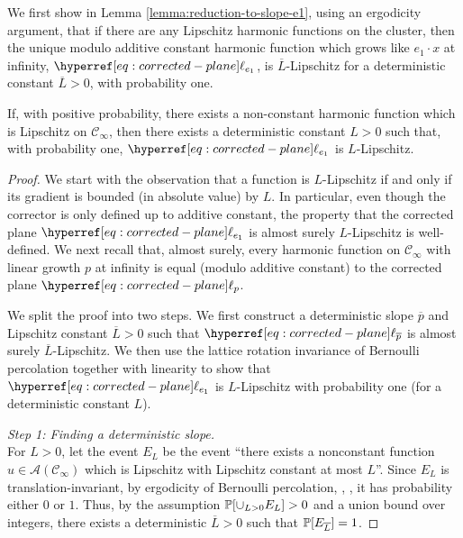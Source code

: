 \documentclass[12pt]{amsart}
\numberwithin{equation}{section}
\begin{document}
	We first show in Lemma \ref{lemma:reduction-to-slope-e1}, using an ergodicity argument, that if there are any Lipschitz harmonic functions on the cluster, then the unique modulo additive constant harmonic function which grows like $e_1 \cdot x$ at infinity, $\ellp{e_1}$, is $\overline{L}$-Lipschitz for a deterministic constant $\overline{L} > 0$,
	with probability one. 
	\begin{lemma} \label{lemma:reduction-to-slope-e1}
		If, with positive probability, there exists a non-constant harmonic function which is Lipschitz on $\mathscr{C}_{\infty}$, then 
		there exists a deterministic constant $L > 0$ such that, with probability one, 
		$\ellp{e_1}$ is $L$-Lipschitz.
	\end{lemma}
	\begin{proof}
		We start with the observation that a function is $L$-Lipschitz if and only if its gradient is bounded (in absolute value) by $L$. In particular, even though the corrector is only defined up to additive constant, the property that the corrected plane $\ellp{e_1}$ is almost surely $L$-Lipschitz is well-defined.
		We next recall that, almost surely, every harmonic function on $\mathscr{C}_{\infty}$ with linear growth $p$ at infinity is equal (modulo additive constant) to the corrected plane $\ellp{p}$. 
		
		
		We split the proof into two steps. We first construct a deterministic slope $\overline{p}$
		and Lipschitz constant $\overline{L} > 0$ such that $\ellp{\overline{p}}$ is almost surely $\overline{L}$-Lipschitz. We then use the lattice rotation invariance 
		of Bernoulli percolation together with linearity to show that $\ellp{e_1}$ is $L$-Lipschitz with probability one (for a deterministic constant $L$).
		
		
		{\it Step 1: Finding a deterministic slope.} \\ 
		For $L > 0$, let the event $E_L$ be the event ``there exists a nonconstant function $u \in \mathcal{A}(\mathscr{C}_\infty)$ which is Lipschitz with Lipschitz constant at most $L$''. Since $E_L$ is translation-invariant, by ergodicity of Bernoulli percolation, \eg, \cite[Proposition 7.3]{lyons-peres-book}, it has probability either $0$ or $1$. Thus, by the assumption $\P[\cup_{L > 0} E_L] > 0$ and a union bound over integers, 
		there exists a deterministic $\overline{L} > 0$ such that $\P[E_{\overline{L}}] = 1$. 
		

\end{proof}
\end{document}
